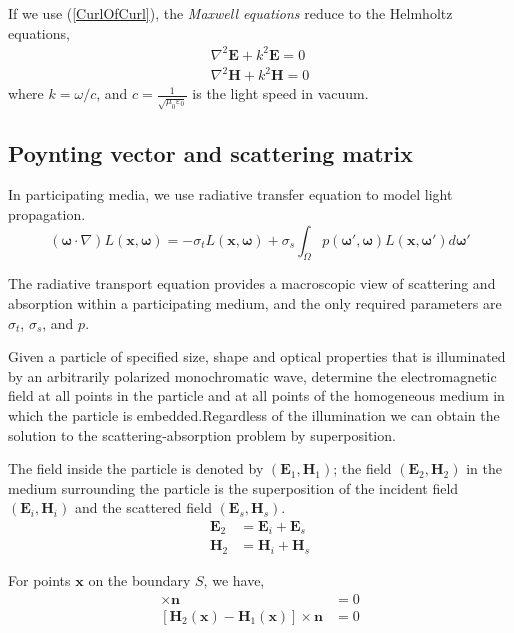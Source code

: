 If we use (\ref{CurlOfCurl}), the \textit{Maxwell equations} reduce to the Helmholtz equations,
\begin{align}
    \nabla^2\mathbf{E} + k^2\mathbf{E} = 0 \\
    \nabla^2\mathbf{H} + k^2\mathbf{H} = 0
\end{align}
where $k = \omega/c$, and $c=\frac{1}{\sqrt{\mu_0\varepsilon_0}}$ is the light speed in vacuum. 


\subsection{Poynting vector and scattering matrix}
\label{subsec:}
In participating media, we use radiative transfer equation to model light propagation.
\begin{equation}
    (\mathbf{\omega}\cdot\nabla)L(\mathbf{x},\mathbf{\omega}) = 
    -\sigma_t L(\mathbf{x},\mathbf{\omega}) + \sigma_s \int_{\Omega}p(\mathbf{\omega}', \mathbf{\omega})
    L(\mathbf{x},\mathbf{\omega}')d\mathbf{\omega}'
\end{equation}

The radiative transport equation provides a macroscopic view of scattering and absorption within a participating medium, and the only required parameters are $\sigma_t$, $\sigma_s$, and $p$.

Given a particle of specified size, shape and optical properties that is illuminated by an arbitrarily polarized monochromatic wave, determine the electromagnetic field at all points in the particle and at all points of the homogeneous medium in which the particle is embedded.Regardless of the illumination we can obtain the solution to the scattering-absorption problem by superposition.

The field inside the particle is denoted by $(\mathbf{E}_1, \mathbf{H}_1)$; the field $(\mathbf{E}_2, \mathbf{H}_2)$ in the medium surrounding the particle is the superposition of the incident field
$(\mathbf{E}_i, \mathbf{H}_i)$ and the scattered field $(\mathbf{E}_s, \mathbf{H}_s)$.
\begin{align}
    \mathbf{E}_2 &= \mathbf{E}_i + \mathbf{E}_s \\
    \mathbf{H}_2 &= \mathbf{H}_i + \mathbf{H}_s 
\end{align}

For points $\mathbf{x}$ on the boundary $S$, we have,
\begin{align}
    [\mathbf{E}_2(\mathbf{x}) - \mathbf{E}_1(\mathbf{x})] \times \mathbf{n} &= 0 \\
    [\mathbf{H}_2(\mathbf{x}) - \mathbf{H}_1(\mathbf{x})] \times \mathbf{n} &= 0 
\end{align}

